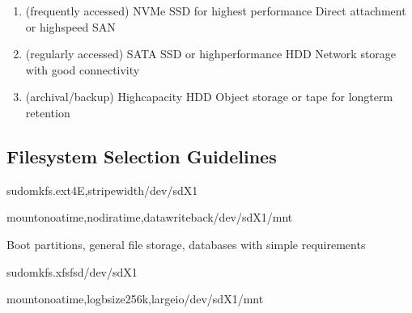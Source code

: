 \documentclass[letterpaper,10pt,english]{sphinxmanual}
\begin{document}
\sphinxAtStartPar
{}
\begin{enumerate}
%
\item {} 
\sphinxAtStartPar
{} (frequently accessed)
\sphinxhyphen{} NVMe SSD for highest performance
\sphinxhyphen{} Direct attachment or high\sphinxhyphen{}speed SAN

\item {} 
\sphinxAtStartPar
{} (regularly accessed)
\sphinxhyphen{} SATA SSD or high\sphinxhyphen{}performance HDD
\sphinxhyphen{} Network storage with good connectivity

\item {} 
\sphinxAtStartPar
{} (archival/backup)
\sphinxhyphen{} High\sphinxhyphen{}capacity HDD
\sphinxhyphen{} Object storage or tape for long\sphinxhyphen{}term retention

\end{enumerate}


\subsection{Filesystem Selection Guidelines}
\label{\detokenize{best-practices:filesystem-selection-guidelines}}
\sphinxAtStartPar
{}

\begin{sphinxVerbatim}[commandchars=\\\{\}]
sudomkfs.ext4\PYGZhy{}E,stripe\PYGZhy{}width/dev/sdX1

mount\PYGZhy{}onoatime,nodiratime,datawriteback/dev/sdX1/mnt
\end{sphinxVerbatim}

\sphinxAtStartPar
{} Boot partitions, general file storage, databases with simple requirements

\sphinxAtStartPar
{}

\begin{sphinxVerbatim}[commandchars=\\\{\}]
sudomkfs.xfs\PYGZhy{}f\PYGZhy{}s\PYGZhy{}d/dev/sdX1

mount\PYGZhy{}onoatime,logbsize256k,largeio/dev/sdX1/mnt
\end{sphinxVerbatim}
\end{document}
